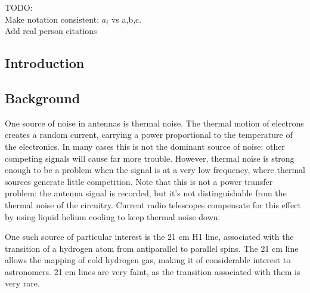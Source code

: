 \documentclass[final]{article}
\begin{document}
TODO:\\
Make notation consistent: \(a_i\) vs a,b,c.\\
Add real person citations

\subsection*{Introduction}
\subsection*{Background}
One source of noise in antennas is thermal noise. The thermal motion of electrons creates a random current, carrying a power proportional to the temperature of the electronics. In many cases this is not the dominant source of noise: other competing signals will cause far more trouble. However, thermal noise is strong enough to be a problem when the signal is at a very low frequency, where thermal sources generate little competition. Note that this is not a power transfer problem: the antenna signal is recorded, but it's not distinguishable from the thermal noise of the circuitry. Current radio telescopes compensate for this effect by using liquid helium cooling to keep thermal noise down.

One such source of particular interest is the 21 cm H1 line, associated with the transition of a hydrogen atom from antiparallel to parallel spins. The 21 cm line allows the mapping of cold hydrogen gas, making it of considerable interest to astronomers. 21 cm lines are very faint, as the transition associated with them is very rare.
\end{document}
